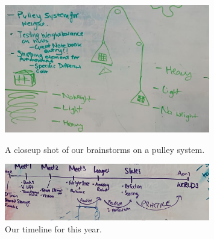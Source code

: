 \begin{figure}[ht]
\centering
\begin{minipage}[b]{.50\textwidth}
  \centering
  \includegraphics[width=0.8\textwidth]{Meetings/September/09-21-21/9-18-21_Team_Image7 - Nathan Forrer.jpg}
  \caption{A closeup shot of our brainstorms on a pulley system.}
  \label{fig:pic7}
\end{minipage}%
\hfill%
\begin{minipage}[b]{.50\textwidth}
  \centering
  \includegraphics[width=0.8\textwidth]{Meetings/September/09-21-21/9-18-21_Team_Image8 - Nathan Forrer.jpg}
  \caption{Our timeline for this year.}
  \label{fig:pic8}
\end{minipage}
\end{figure}


